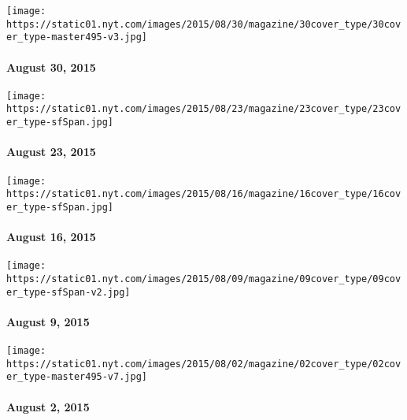\href{http://www.nytimes.com/indexes/2015/08/30/magazine/index.html}{}

\texttt{[image: https://static01.nyt.com/images/2015/08/30/magazine/30cover\_type/30cover\_type-master495-v3.jpg]}

\hypertarget{august-30-2015}{%
\paragraph{August 30, 2015}\label{august-30-2015}}

\href{http://www.nytimes.com/indexes/2015/08/23/magazine/index.html}{}

\texttt{[image: https://static01.nyt.com/images/2015/08/23/magazine/23cover\_type/23cover\_type-sfSpan.jpg]}

\hypertarget{august-23-2015}{%
\paragraph{August 23, 2015}\label{august-23-2015}}

\href{http://www.nytimes.com/indexes/2015/08/16/magazine/index.html}{}

\texttt{[image: https://static01.nyt.com/images/2015/08/16/magazine/16cover\_type/16cover\_type-sfSpan.jpg]}

\hypertarget{august-16-2015}{%
\paragraph{August 16, 2015}\label{august-16-2015}}

\href{http://www.nytimes.com/indexes/2015/08/09/magazine/index.html}{}

\texttt{[image: https://static01.nyt.com/images/2015/08/09/magazine/09cover\_type/09cover\_type-sfSpan-v2.jpg]}

\hypertarget{august-9-2015}{%
\paragraph{August 9, 2015}\label{august-9-2015}}

\href{http://www.nytimes.com/indexes/2015/08/02/magazine/index.html}{}

\texttt{[image: https://static01.nyt.com/images/2015/08/02/magazine/02cover\_type/02cover\_type-master495-v7.jpg]}

\hypertarget{august-2-2015}{%
\paragraph{August 2, 2015}\label{august-2-2015}}

